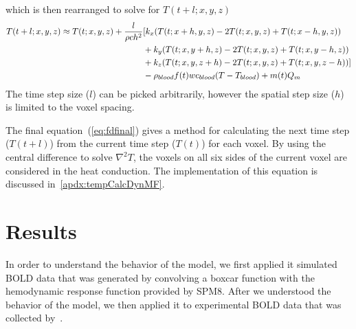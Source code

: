   which is then rearranged to solve for $T(t+l;x,y,z)$
  \begin{align}
    \label{eq:fdfinal}
    T(t+l;x,y,z) \approx T(t;x,y,z) + \frac{l}{\rho c h^2} 
    & [k_x (T(t;x+h,y,z)-2 T(t;x,y,z)+T(t;x-h,y,z)) \notag\\
    & + k_y (T(t;x,y+h,z)-2 T(t;x,y,z)+T(t;x,y-h,z))\notag\\
    & + k_z (T(t;x,y,z+h)-2 T(t;x,y,z)+T(t;x,y,z-h))]\notag\\
    & -\rho_{blood}f(t)wc_{blood}(T-T_{blood})+m(t)Q_{m}
  \end{align}
  The time step size ($l$) can be picked arbitrarily, however the spatial step size ($h$) is limited to the voxel spacing.
  
  The final equation~(\cref{eq:fdfinal}) gives a method for calculating the next time step ($T(t+l)$) from the current time step ($T(t)$) for each voxel.  By using the central difference to solve $\nabla^2 T$, the voxels on all six sides of the current voxel are considered in the heat conduction.  The implementation of this equation is discussed in~\cref{apdx:tempCalcDynMF}.
  
  \section{\label{sec:results} Results} 
   In order to understand the behavior of the model, we first applied it simulated BOLD data that was generated by convolving a boxcar function with the hemodynamic response function provided by SPM8.  After we understood the behavior of the model, we then applied it to experimental BOLD data that was collected by~\citet{dhamala}.

